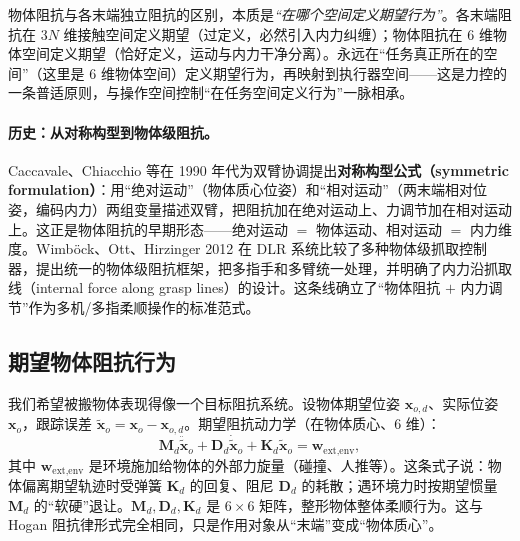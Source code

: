 \begin{insight}
物体阻抗与各末端独立阻抗的区别，本质是\emph{“在哪个空间定义期望行为”}。各末端阻抗在 $3N$ 维接触空间定义期望（过定义，必然引入内力纠缠）；物体阻抗在 $6$ 维物体空间定义期望（恰好定义，运动与内力干净分离）。永远在“任务真正所在的空间”（这里是 $6$ 维物体空间）定义期望行为，再映射到执行器空间——这是力控的一条普适原则，与操作空间控制“在任务空间定义行为”一脉相承。
\end{insight}

\paragraph{历史：从对称构型到物体级阻抗。}
Caccavale、Chiacchio 等在 1990 年代为双臂协调提出\textbf{对称构型公式（symmetric formulation）}：用“绝对运动”（物体质心位姿）和“相对运动”（两末端相对位姿，编码内力）两组变量描述双臂，把阻抗加在绝对运动上、力调节加在相对运动上\cite{caccavale2008six}。这正是物体阻抗的早期形态——绝对运动 $=$ 物体运动、相对运动 $=$ 内力维度。Wimb\"ock、Ott、Hirzinger 2012\cite{wimbock2012comparison} 在 DLR 系统比较了多种物体级抓取控制器，提出统一的物体级阻抗框架，把多指手和多臂统一处理，并明确了内力沿抓取线（internal force along grasp lines）的设计。这条线确立了“物体阻抗 $+$ 内力调节”作为多机/多指柔顺操作的标准范式。

\subsection{期望物体阻抗行为}
\label{sec:cm-impedance-desired}
我们希望被搬物体表现得像一个目标阻抗系统。设物体期望位姿 $\mathbf{x}_{o,d}$、实际位姿 $\mathbf{x}_o$，跟踪误差 $\tilde{\mathbf{x}}_o=\mathbf{x}_o-\mathbf{x}_{o,d}$。期望阻抗动力学（在物体质心、$6$ 维）：
\begin{equation}
  \mathbf{M}_d\ddot{\tilde{\mathbf{x}}}_o+\mathbf{D}_d\dot{\tilde{\mathbf{x}}}_o+\mathbf{K}_d\tilde{\mathbf{x}}_o=\mathbf{w}_{\text{ext,env}},
  \label{eq:cm-obj-imp}
\end{equation}
其中 $\mathbf{w}_{\text{ext,env}}$ 是环境施加给物体的外部力旋量（碰撞、人推等）。这条式子说：物体偏离期望轨迹时受弹簧 $\mathbf{K}_d$ 的回复、阻尼 $\mathbf{D}_d$ 的耗散；遇环境力时按期望惯量 $\mathbf{M}_d$ 的“软硬”退让。$\mathbf{M}_d,\mathbf{D}_d,\mathbf{K}_d$ 是 $6\times 6$ 矩阵，整形物体整体柔顺行为。这与 Hogan 阻抗律形式完全相同，只是作用对象从“末端”变成“物体质心”。

